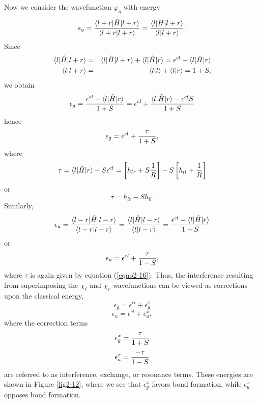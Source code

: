 Now we consider the wavefunction $\varphi_g$ with energy
\begin{equation}
\epsilon_g = {\langle l + r \vert {\hat H} \vert l + r \rangle 
\over \langle l + r \vert l + r \rangle} = {\langle l \vert H \vert 
l + r \rangle \over \langle l \vert l + r \rangle}.
\end{equation}
Since
\begin{eqnarray*}
\langle l \vert {\hat H} \vert l + r \rangle &=& 
\langle l \vert {\hat H} \vert l + r \rangle +
\langle l \vert {\hat H} \vert r \rangle = \epsilon^{cl} +
\langle l \vert {\hat H} \vert r \rangle\cr
\langle l \vert l + r \rangle &=& \langle l \vert l \rangle + \langle 
l \vert r \rangle = 1 + S,\cr
\end{eqnarray*}
we obtain
\begin{equation}
\epsilon_g = {\epsilon^{cl} + \langle l | {\hat H} | r \rangle \over 
1 + S} = \epsilon^{cl} + {\langle l | {\hat H} | r \rangle - 
\epsilon^{cl} S \over 1 + S}
\end{equation}
hence
\begin{equation}
\epsilon_g = \epsilon^{cl} + {\tau \over 1+S},
\end{equation}
where
\begin{equation}
\tau = \langle l | {\hat H} | r \rangle - S \epsilon^{cl} = \left[ 
h_{lr} + S {1 \over R} \right] - S \left[ h_{ll} + {1 \over R} \right]
\end{equation}
or
\begin{equation}
\tau = h_{lr} - Sh_{ll}.
\label{eqno2-16}
\end{equation}
Similarly,
\begin{equation}
\epsilon_u = {\langle l - r | {\hat H} | l - r \rangle \over \langle 
l - r | l - r \rangle} = {\langle l | {\hat H} | l - r \rangle \over 
\langle l | l - r \rangle} = {\epsilon^{cl} - \langle l | {\hat H} | 
r \rangle \over 1 - S}
\end{equation}
or
\begin{equation}
\epsilon_u = \epsilon^{cl} + {\tau \over 1-S},
\end{equation}
where $\tau$ is again given by equation (\ref{eqno2-16}). Thus, the
interference resulting from superimposing the $\chi_\ell$ and $\chi_r$
wavefunctions can be viewed as corrections upon the classical energy,
\begin{equation}
\epsilon_g = \epsilon^{cl} + \epsilon_g^x
\end{equation}
\begin{equation}
\epsilon_u =  \epsilon^{cl} + \epsilon_u^x,
\end{equation}
where the correction terms
\begin{equation}
\epsilon_g^x = {\tau \over 1+S}
\label{eqno2-17a}
\end{equation}
\begin{equation}
\epsilon_u^x = {-\tau \over 1-S}
\label{eqno2-17b}
\end{equation}
are referred to as interference, exchange, or resonance terms. These
energies are shown in Figure \ref{fig2-12}, where we see that
$\epsilon_g^x$ favors bond formation, while $\epsilon^x_u$ opposes
bond formation.
    
